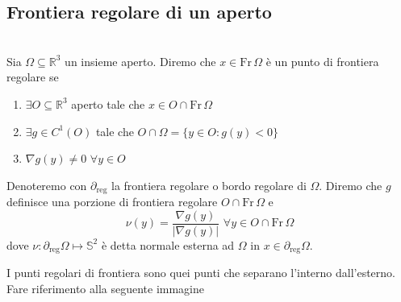 \subsection{Frontiera regolare di un aperto}
%
\begin{definition}[\textcolor{blue}{punto regolare di frontiera e derivata esterna}] \hspace{1cm} \\
	Sia $\Omega \subseteq \mathbb{R}^3$ un insieme aperto. Diremo che $x \in \text{Fr} \, \Omega$ è un punto di frontiera regolare se
	\begin{enumerate}[label=\protect\circled{\arabic*}]
		\item $\exists O \subseteq \mathbb{R}^3$ aperto tale che $x \in O \cap \text{Fr} \, \Omega$
		\item $\exists g \in C^1(O)$ tale che $O \cap \Omega = \{y \in O : g(y) < 0 \}$
		\item $\nabla g(y) \neq 0 \, \, \forall y \in O$
	\end{enumerate}
	Denoteremo con $\partial_{\text{reg}}$ la frontiera regolare o bordo regolare di $\Omega$. Diremo che $g$ definisce una porzione di frontiera regolare
	$O \cap \text{Fr} \, \Omega$ e
	$$
	\nu(y) = \frac{\nabla g(y)}{|\nabla g(y)|} \, \, \forall y \in O \cap \text{Fr} \, \Omega
	$$
	dove $\nu: \partial_{\text{reg}} \Omega \mapsto \mathbb{S}^2$ è detta normale esterna ad $\Omega$ in $x \in \partial_{\text{reg}} \Omega$.
\end{definition}
%
\begin{remark}
I punti regolari di frontiera sono quei punti che separano l'interno dall'esterno. Fare riferimento alla seguente immagine
%
\begin{figure}[H]
    \centering
\end{figure}
%
\end{remark}
